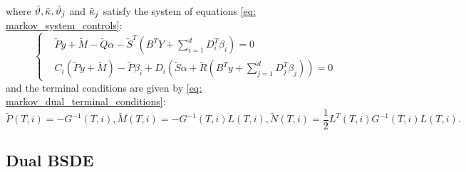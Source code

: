 where $\tilde{\vartheta}, \Tilde{\kappa}, \Tilde{\vartheta}_j$ and $\Tilde{\kappa}_j$ satisfy the system of equations \eqref{eq: markov_system_controls}:
\begin{equation*}
\begin{cases}
    &\tilde{P}y + \tilde{M} - \tilde{Q}\alpha - \tilde{S}^T (B^T Y + \sum_{i=1}^d D_i^T \beta_i) = 0\\
    &C_i (\tilde{P}y + \tilde{M}) - \tilde{P} \beta_i
    + D_i (\tilde{S}\alpha + \tilde{R}(B^T y + \sum_{j=1}^d D_j^T \beta_j)) = 0
\end{cases}
\end{equation*}
and the terminal conditions are given by \eqref{eq: markov_dual_terminal_conditions}:
\begin{equation}
    \tilde{P}(T,i) = -G^{-1}(T,i),  \tilde{M}(T,i) = - G^{-1}(T,i)L(T,i),  \tilde{N}(T,i) = \frac12 L^T(T,i)G^{-1}(T,i)L(T,i). \label{eq: markov_dual_hjb_terminal_conditions}
\end{equation}
 \newpage
\subsection{Dual BSDE}
